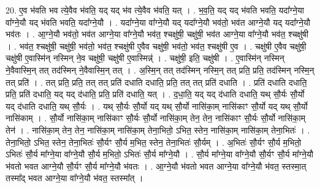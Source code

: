 \documentclass[17pt]{extarticle}
\begin{document}
20. ए॒व भ॑वति भव त्ये॒वैव भ॑वति॒ यद् यद् भ॑व त्ये॒वैव भ॑वति॒ यत् । . भ॒व॒ति॒ यद् यद् भ॑वति भवति॒ यदा᳚ग्ने॒या वा᳚ग्ने॒यौ यद् भ॑वति भवति॒ यदा᳚ग्ने॒यौ । . यदा᳚ग्ने॒या वा᳚ग्ने॒यौ यद् यदा᳚ग्ने॒यौ भव॑तो॒ भव॑त आग्ने॒यौ यद् यदा᳚ग्ने॒यौ भव॑तः । . आ॒ग्ने॒यौ भव॑तो॒ भव॑त आग्ने॒या वा᳚ग्ने॒यौ भव॑त॒ श्चक्षु॑षी॒ चक्षु॑षी॒ भव॑त आग्ने॒या वा᳚ग्ने॒यौ भव॑त॒ श्चक्षु॑षी । . भव॑त॒ श्चक्षु॑षी॒ चक्षु॑षी॒ भव॑तो॒ भव॑त॒ श्चक्षु॑षी ए॒वैव चक्षु॑षी॒ भव॑तो॒ भव॑त॒ श्चक्षु॑षी ए॒व । . चक्षु॑षी ए॒वैव चक्षु॑षी॒ चक्षु॑षी ए॒वास्मि॑न् नस्मिन् ने॒व चक्षु॑षी॒ चक्षु॑षी ए॒वास्मिन्न्॑ । . चक्षु॑षी॒ इति॒ चक्षु॑षी । . ए॒वास्मि॑न् नस्मिन् ने॒वैवास्मि॒न् तत् तद॑स्मिन् ने॒वैवास्मि॒न् तत् । . अ॒स्मि॒न् तत् तद॑स्मिन् नस्मि॒न् तत् प्रति॒ प्रति॒ तद॑स्मिन् नस्मि॒न् तत् प्रति॑ । . तत् प्रति॒ प्रति॒ तत् तत् प्रति॑ दधाति दधाति॒ प्रति॒ तत् तत् प्रति॑ दधाति । . प्रति॑ दधाति दधाति॒ प्रति॒ प्रति॑ दधाति॒ यद् यद् द॑धाति॒ प्रति॒ प्रति॑ दधाति॒ यत् । . द॒धा॒ति॒ यद् यद् द॑धाति दधाति॒ यथ् सौ॒र्यः सौ॒र्यो यद् द॑धाति दधाति॒ यथ् सौ॒र्यः । . यथ् सौ॒र्यः सौ॒र्यो यद् यथ् सौ॒र्यो नासि॑का॒म् नासि॑काꣳ सौ॒र्यो यद् यथ् सौ॒र्यो नासि॑काम् । . सौ॒र्यो नासि॑का॒म् नासि॑काꣳ सौ॒र्यः सौ॒र्यो नासि॑का॒म् तेन॒ तेन॒ नासि॑काꣳ सौ॒र्यः सौ॒र्यो नासि॑का॒म् तेन॑ । . नासि॑का॒म् तेन॒ तेन॒ नासि॑का॒म् नासि॑का॒म् तेना॒भितो॒ ऽभित॒ स्तेन॒ नासि॑का॒म् नासि॑का॒म् तेना॒भितः॑ । . तेना॒भितो॒ ऽभित॒ स्तेन॒ तेना॒भितः॑ सौ॒र्यꣳ सौ॒र्य म॒भित॒ स्तेन॒ तेना॒भितः॑ सौ॒र्यम् । . अ॒भितः॑ सौ॒र्यꣳ सौ॒र्य म॒भितो॒ ऽभितः॑ सौ॒र्य मा᳚ग्ने॒या वा᳚ग्ने॒यौ सौ॒र्य म॒भितो॒ ऽभितः॑ सौ॒र्य मा᳚ग्ने॒यौ । . सौ॒र्य मा᳚ग्ने॒या वा᳚ग्ने॒यौ सौ॒र्यꣳ सौ॒र्य मा᳚ग्ने॒यौ भ॑वतो भवत आग्ने॒यौ सौ॒र्यꣳ सौ॒र्य मा᳚ग्ने॒यौ भ॑वतः । . आ॒ग्ने॒यौ भ॑वतो भवत आग्ने॒या वा᳚ग्ने॒यौ भ॑वत॒ स्तस्मा॒त् तस्मा᳚द् भवत आग्ने॒या वा᳚ग्ने॒यौ भ॑वत॒ स्तस्मा᳚त् । \newline
\end{document}
